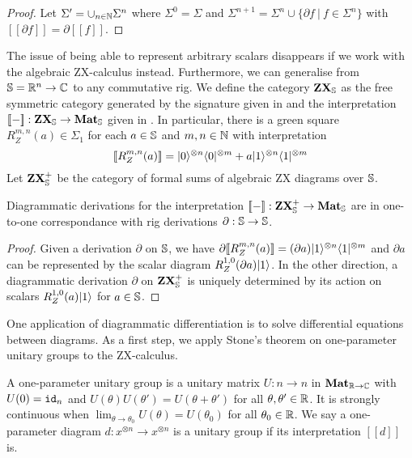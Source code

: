 \begin{proof}
Let $\Sigma' = \cup_{n \in \N} \Sigma^n$ where $\Sigma^0 = \Sigma$
and $\Sigma^{n + 1} = \Sigma^n \cup \{ \partial f \ \vert \ f \in \Sigma^n \}$
with $[\![\partial f]\!] = \partial [\![f]\!]$.
\end{proof}

The issue of being able to represent arbitrary scalars disappears if we work
with the algebraic ZX-calculus instead. Furthermore, we can generalise
from $\S = \R^n \to \C$ to any commutative rig.
We define the category $\mathbf{ZX}_\S$ as the free symmetric category generated by the signature given in \cite[Table~2]{Wang20} and the interpretation $[\![-]\!] : \mathbf{ZX}_\S \to \mathbf{Mat}_\S$ given in \cite[§6]{Wang20}.
In particular, there is a green square $R_Z^{m, n}(a) \in \Sigma_1$ for each $a \in \S$ and $m, n \in \N$ with interpretation
$$[\![R_Z^{m, n}(a)]\!] = \ket{0}^{\otimes n} \bra{0}^{\otimes m} + a \ket{1}^{\otimes n} \bra{1}^{\otimes m}$$
Let $\mathbf{ZX}_\S^+$ be the category of formal sums of algebraic ZX
diagrams over $\S$.

\begin{theorem}
Diagrammatic derivations for the interpretation $[\![-]\!] : \mathbf{ZX}_\S^+ \to \mathbf{Mat}_\S$
are in one-to-one correspondance with rig derivations $\partial : \S \to \S$.
\end{theorem}

\begin{proof}
Given a derivation $\partial$ on $\S$, we have
$\partial [\![R_Z^{m, n}(a)]\!]
= (\partial a) \ket{1}^{\otimes n} \bra{1}^{\otimes m}$
and $\partial a$ can be represented by the scalar diagram
$R_Z^{1, 0}(\partial a) \ket{1}$.
In the other direction, a diagrammatic derivation $\partial$ on
$\mathbf{ZX}_\S^+$ is uniquely determined by its action on scalars
$R_Z^{1, 0}(a) \ket{1}$ for $a \in \S$.
\end{proof}

One application of diagrammatic differentiation is to solve
differential equations between diagrams. As a first step,
we apply Stone's theorem \cite{Stone32} on one-parameter unitary groups
to the ZX-calculus.

\begin{definition}
A one-parameter unitary group is a unitary matrix $U : n \to n$
in $\mathbf{Mat}_{\R \to \C}$ with $U(0) = \id_n$ and $U(\theta) U(\theta') = U(\theta + \theta')$
for all $\theta, \theta' \in \R$. It is strongly continuous when
$\lim_{\theta \to \theta_0} U(\theta) = U(\theta_0)$ for all $\theta_0 \in \R$.
We say a one-parameter diagram $d : x^{\otimes n} \to x^{\otimes n}$
is a unitary group if its interpretation $[\![d]\!]$ is.
\end{definition}

